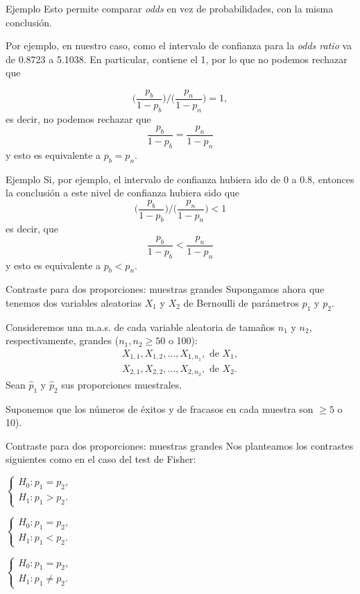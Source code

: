 \documentclass[
  ignorenonframetext,
]{beamer}
\begin{document}
\begin{frame}{Ejemplo}
\protect\hypertarget{ejemplo-10}{}
Esto permite comparar \emph{odds} en vez de probabilidades, con la misma
conclusión.

Por ejemplo, en nuestro caso, como el intervalo de confianza para la
\emph{odds ratio} va de 0.8723 a 5.1038. En particular, contiene el 1,
por lo que no podemos rechazar que

\[
\Big({\frac{p_b}{1-p_b}}\Big)\Big/\Big({\frac{p_n}{1-p_n}}\Big)=1,
\] es decir, no podemos rechazar que \[
\frac{p_b}{1-p_b}=\frac{p_n}{1-p_n}
\] y esto es equivalente a \(p_b=p_n\).
\end{frame}

\begin{frame}{Ejemplo}
\protect\hypertarget{ejemplo-11}{}
Si, por ejemplo, el intervalo de confianza hubiera ido de 0 a 0.8,
entonces la conclusión a este nivel de confianza hubiera sido que \[
\Big({\frac{p_b}{1-p_b}}\Big)\Big/\Big({\frac{p_n}{1-p_n}}\Big)<1
\] es decir, que \[
\frac{p_b}{1-p_b}<\frac{p_n}{1-p_n}
\] y esto es equivalente a \(p_b<p_n\).
\end{frame}

\begin{frame}{Contraste para dos proporciones: muestras grandes}
\protect\hypertarget{contraste-para-dos-proporciones-muestras-grandes}{}
Supongamos ahora que tenemos dos variables aleatorias \(X_1\) y \(X_2\)
de Bernoulli de parámetros \(p_1\) y \(p_2\).

Consideremos una m.a.s. de cada variable aleatoria de tamaños \(n_1\) y
\(n_2\), respectivamente, grandes (\(n_1,n_2\geq 50\) o 100): \[
\begin{array}{l}
X_{1,1}, X_{1,2},\ldots, X_{1,n_1},\mbox{ de }X_1,\\
X_{2,1}, X_{2,2},\ldots, X_{2,n_2},\mbox{ de }X_2.
\end{array}
\] Sean \(\widehat{p}_1\) y \(\widehat{p}_2\) sus proporciones
muestrales.

Suponemos que los números de éxitos y de fracasos en cada muestra son
\(\geq 5\) o 10).
\end{frame}

\begin{frame}{Contraste para dos proporciones: muestras grandes}
\protect\hypertarget{contraste-para-dos-proporciones-muestras-grandes-1}{}
Nos planteamos los contrastes siguientes como en el caso del test de
Fisher:

\(\left\{\begin{array}{l} H_0:p_1=p_2,\\ H_1:p_1> p_2. \end{array}\right.\)

\(\left\{\begin{array}{l} H_0:p_1=p_2,\\ H_1:p_1< p_2. \end{array}\right.\)

\(\left\{\begin{array}{l} H_0:p_1=p_2,\\ H_1:p_1\neq p_2. \end{array}\right.\)
\end{frame}
\end{document}
